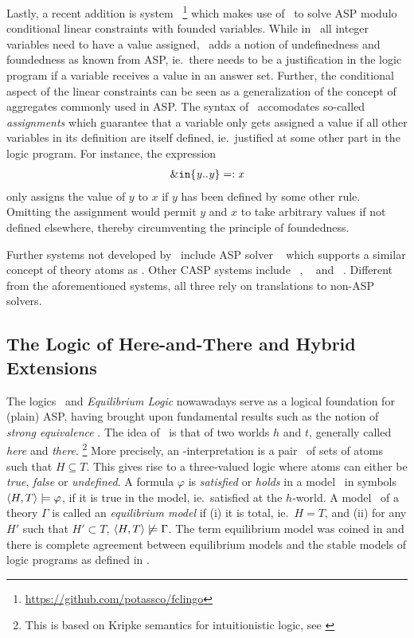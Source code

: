 Lastly, a recent addition is system \fclingo\ \footnote{\url{https://github.com/potassco/fclingo}} which makes use of \clingcon\
to solve ASP modulo conditional linear constraints with founded variables.
%
While in \clingcon\ all integer variables need to have a value assigned,
\fclingo\ adds a notion of undefinedness and foundedness as known from ASP,
ie.\ there needs to be a justification in the logic program if a variable receives a value in an answer set.
%
Further, the conditional aspect of the linear constraints can be seen as a generalization of the concept of aggregates commonly used in ASP.
%
The syntax of \fclingo\ accomodates so-called \emph{assignments} which guarantee that a variable only gets assigned a value if
all other variables in its definition are itself defined, ie.\ justified at some other part in the logic program.
For instance, the expression
\begin{align*}\label{fclingo:assignment}
    \mathtt{\&in\{\mathit{y}..\mathit{y}\} =: \textit{x}}
\end{align*}
only assigns the value of $y$ to $x$ if $y$ has been defined by some other rule.
%
Omitting the assignment would permit $y$ and $x$ to take arbitrary values if not defined elsewhere, thereby circumventing the principle of foundedness.

Further systems not developed by \potassco\ include ASP solver \dlvhex\ \cite{redl16a} which supports a similar concept of theory atoms as \clingo.
%
Other CASP systems include \dingo\ \cite{janise09a}, \mingo\ \cite{lijani12a} and \ezsmt\ \cite{liesus16a}.
Different from the aforementioned systems, all three rely on translations to non-ASP solvers.


\subsection{The Logic of Here-and-There and Hybrid Extensions}\label{sec:semantics}
The logics \HT\ and \emph{Equilibrium Logic} nowawadays serve as a logical foundation for (plain) ASP,
having brought upon fundamental results such as the notion of \emph{strong equivalence} \cite{lipeva01a}.
%
The idea of \HT\ is that of two worlds $h$ and $t$, generally called \emph{here} and \emph{there}.
\footnote{This is based on Kripke semantics for intuitionistic logic, see \cite{dalen86a}}
%
More precisely, an \HT-interpretation is a pair \handt\ of sets of atoms such that $H \subseteq T$.
%
This gives rise to a three-valued logic where atoms can either be \textit{true}, \textit{false} or \textit{undefined}.
%
A formula $\varphi$ is \emph{satisfied} or \emph{holds} in a model \handt\, in symbols $\langle H,T \rangle \models \varphi$, if it is true in the model, ie.\ satisfied at the $h$\nobreakdash-world.
%
A model \handt\ of a theory $\Gamma$ is called an \emph{equilibrium model} if
(i) it is total, ie.\ $H = T$, and
(ii) for any $H'$ such that $H' \subset T$, $\langle H,T \rangle \not\models \Gamma$.
%
The term equilibrium model was coined in \cite{pearce96a} and there is complete agreement between equilibrium models and the stable models of logic programs as defined in \cite{gellif88b}.


